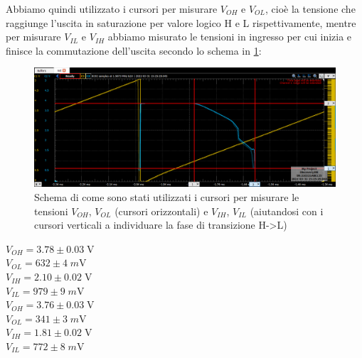 \documentclass[10pt, a4paper, italian]{article}
\begin{document}
Abbiamo quindi utilizzato i cursori per misurare $V_{OH}$ e $V_{OL}$, cioè
la tensione che raggiunge l'uscita in saturazione per valore logico H e L
rispettivamente, mentre per misurare $V_{IL}$ e $V_{IH}$ abbiamo misurato le
tensioni in ingresso per cui inizia e finisce la commutazione dell'uscita
secondo lo schema in \cref{fig: trans}:
\begin{figure}[htbp]
\centering
	\includegraphics[width=\textwidth]{trans}
	\caption{\label{fig: trans}Schema di come sono stati utilizzati i cursori per misurare le tensioni $V_{OH}$, $V_{OL}$ (cursori orizzontali) e $V_{IH}$, $V_{IL}$ (aiutandosi con i cursori verticali a individuare la fase di transizione H->L)}
	
\end{figure}
\begin{multicols}{2}
    \centering
    $V_{OH} = 3.78 \pm 0.03\; \si{\V}$ \\
	$V_{OL} = 632 \pm 4 \; \si{m\V}$ \\
	$V_{IH} = 2.10 \pm 0.02 \; \si{\V} $\\
	$V_{IL} = 979 \pm 9\; \si{m\V} $\\
    
    $V_{OH} = 3.76 \pm 0.03\; \si{\V}$ \\
	$V_{OL} = 341 \pm 3 \; \si{m\V}$ \\
	$V_{IH} = 1.81 \pm 0.02 \; \si{\V} $\\
	$V_{IL} = 772 \pm 8\; \si{m\V} $\\
\end{multicols}
\end{document}
